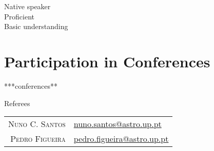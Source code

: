 \documentclass[10pt]{article}
\makeatletter
\renewcommand{\labelenumi}{\@biblabel{A\theenumi}} %
\makeatother
\begin{document}
\begin{minipage}{\linewidth}
\begin{multicols}{4}
\begin{itemize}
        \skills{~}{}
        \skills{~}{}
        \end{itemize}
      \end{multicols}
      \begin{minipage}{0.5\linewidth}
        \begin{footnotesize}
        \raggedleft
           Native speaker \threeskill \\
          Proficient \twoskill \\
          Basic understanding \oneskill \\
        \end{footnotesize}
      \end{minipage}

  \end{minipage}

\fi






\ifconferences

  \section{Participation in Conferences}
  \begin{itemize}

    ***conferences**

  \end{itemize}

\fi


\ifreferees

  \vspace{5in}
  {\Large\scshape\raggedright\sffamily Referees}
  \newcommand{\service}[2]{
    \textsc{#1} & #2\\[1em]
  }
  \begin{longtable}{r|p{10cm}}
    \service{Nuno C. Santos}{\href{mailto:nuno.santos@astro.up.pt}{nuno.santos@astro.up.pt}}
    \service{Pedro Figueira}{\href{mailto:pedro.figueira@astro.up.pt}{pedro.figueira@astro.up.pt}}
  \end{longtable}

\fi


\thispagestyle{last-page}
\end{document}
